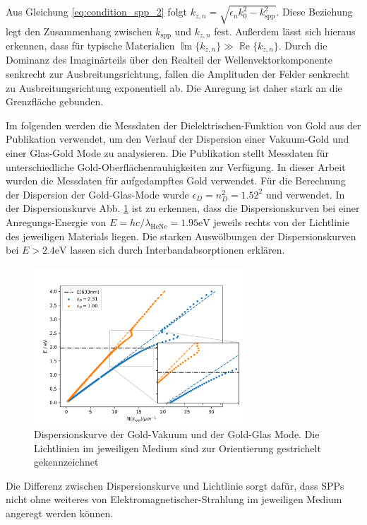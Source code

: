 \documentclass[titlepage]{article}
\renewcommand{\Re}{\operatorname{\mathbb{R}e}}
\begin{document}
		 Aus Gleichung \eqref{eq:condition_spp_2} folgt $k_{z, n} = \sqrt{\epsilon_n k_0^2 - k_{\mathrm{spp}}^2}$. Diese Beziehung legt den Zusammenhang zwischen $k_{\mathrm{spp}}$ und $k_{z, n}$ fest. Außerdem lässt sich hieraus erkennen, dass für typische Materialien $ \operatorname{\mathbb{I}m}\{k_{z, n}\} \gg \Re\{k_{z, n}\}$. Durch die Dominanz des Imaginärteils über den Realteil der Wellenvektorkomponente senkrecht zur Ausbreitungsrichtung, fallen die Amplituden der Felder senkrecht zu Ausbreitungsrichtung exponentiell ab. Die Anregung ist daher stark an die Grenzfläche gebunden. 
	
	Im folgenden werden die Messdaten der Dielektrischen-Funktion von Gold aus der Publikation \cite{Olmon.2012} verwendet, um den Verlauf der Dispersion einer Vakuum-Gold und einer Glas-Gold Mode zu analysieren.  Die Publikation stellt Messdaten für unterschiedliche Gold-Oberflächenrauhigkeiten zur Verfügung. In dieser Arbeit wurden die Messdaten für aufgedampftes Gold verwendet. Für die Berechnung der Dispersion der Gold-Glas-Mode wurde $\epsilon_D = n_D^2 = 1.52^2$ und  verwendet. In der Dispersionskurve Abb. \ref{fig:dispersion_spp} ist zu erkennen, dass die Dispersionskurven bei einer Anregungs-Energie von $E = hc/\lambda_{\mathrm{HeNe}}= 1.95\mathrm{eV}$ jeweils rechts von der Lichtlinie des jeweiligen Materials liegen. Die starken Auswölbungen der Dispersionskurven bei $E > 2.4 \mathrm{eV}$ lassen sich durch Interbandabsorptionen erklären.
	\begin{figure}[h]
		\label{fig:dispersion_spp}
		\centering
		\includegraphics[width=0.7\textwidth]{figures/dispersion.png}
		\caption{Dispersionskurve der Gold-Vakuum und der Gold-Glas Mode. Die Lichtlinien im jeweiligen Medium sind zur Orientierung gestrichelt gekennzeichnet}		
	\end{figure}
	Die Differenz zwischen Dispersionskurve und Lichtlinie sorgt dafür, dass SPPs nicht ohne weiteres von Elektromagnetischer-Strahlung im jeweiligen Medium angeregt werden können.	
\end{document}
